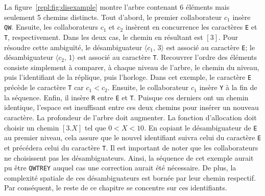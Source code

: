 La figure~\ref{repl:fig:disexample} montre l'arbre contenant 6 éléments mais
seulement 5 chemins distincts. Tout d'abord, le premier collaborateur $c_1$
insère \texttt{QW}. Ensuite, les collaborateurs $c_1$ et $c_2$ insèrent en
concurrence les caractères \texttt{E} et \texttt{T}, respectivement. Dans les
deux cas, le chemin en résultant est $[3]$. Pour résoudre cette ambiguïté, le
désambiguateur $\langle c_1,\, 3 \rangle$ est associé au caractère \texttt{E};
le désambiguateur $\langle c_2,\, 1 \rangle$ est associé au caractère
\texttt{T}. Recouvrer l'ordre des éléments consiste simplement à comparer, à
chaque niveau de l'arbre, le chemin du niveau, puis l'identifiant de la
réplique, puis l'horloge. Dans cet exemple, le caractère \texttt{E} précède le
caractère \texttt{T} car $c_1< c_2$. Ensuite, le collaborateur $c_1$ insère
\texttt{Y} à la fin de la séquence. Enfin, il insère \texttt{R} entre \texttt{E}
et \texttt{T}. Puisque ces derniers ont un chemin identique, l'espace est
insuffisant entre ces deux chemins pour insérer un nouveau caractère. La
profondeur de l'arbre doit augmenter. La fonction d'allocation doit choisir un
chemin $[3.X]$ tel que $0<X<10$. En copiant le désambiguateur de \texttt{E} au
premier niveau, cela assure que le nouvel identifiant suivra celui du caractère
\texttt{E} et précédera celui du caractère \texttt{T}. Il est important de noter
que les collaborateurs ne choisissent pas les désambiguateurs. Ainsi, la
séquence de cet exemple aurait pu être \texttt{QWTREY} auquel cas une correction
aurait été nécessaire. De plus, la complexité spatiale de ces désambiguateurs
est bornée par leur chemin respectif. Par conséquent, le reste de ce chapitre se
concentre sur ces identifiants.



